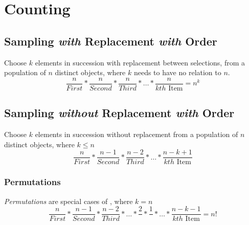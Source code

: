 \section{Counting} \label{sec:Counting}
		\subsection{Sampling \emph{with} Replacement \emph{with} Order} \label{subsec:Ordered Sampling with Replacement}
		\begin{definition} \label{def:Ordered Sampling with Replacement}
			Choose $k$ elements in succession with replacement between selections, from a population of $n$ distinct objects, where $k$ needs to have no relation to $n$.
			\begin{equation} \label{eq:Ordered Sampling with Replacement}
				\frac{n}{First} * \frac{n}{Second} * \frac{n}{Third} * \ldots * \frac{n}{kth \text{ Item}} = n^{k}
			\end{equation}
		\end{definition}
	
	\subsection{Sampling \emph{without} Replacement \emph{with} Order} \label{subsec:Ordered Sampling without Replacement}
		\begin{definition} \label{def:Ordered Sampling without Replacement}
			Choose $k$ elements in succession without replacement from a population of $n$ distinct objects, where $k \leq n$
			\begin{equation} \label{eq:Ordered Sampling without Replacement}
				\frac{n}{First} * \frac{n-1}{Second} * \frac{n-2}{Third} * \ldots * \frac{n-k+1}{kth \text{ Item}}
			\end{equation}
		\end{definition}
		
		\subsubsection{Permutations} \label{subsubsec:Permutations}
			\begin{definition}[Permutation] \label{def:Permutation}
				\emph{Permutations} are special cases of , where $k = n$
				\begin{equation} \label{eq:Permutation}
					\frac{n}{First} * \frac{n-1}{Second} * \frac{n-2}{Third} * \ldots * \frac{2}{} * \frac{1}{} * \ldots * \frac{n-k-1}{kth \text{ Item}} = n!
				\end{equation}
			\end{definition}
		
